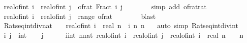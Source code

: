 \begin{isabellebody}
\ {\isachardoublequoteopen}real{\isacharunderscore}{\kern0pt}of{\isacharunderscore}{\kern0pt}int\ i\ {\isacharslash}{\kern0pt}\ real{\isacharunderscore}{\kern0pt}of{\isacharunderscore}{\kern0pt}int\ j\ {\isacharequal}{\kern0pt}\ of{\isacharunderscore}{\kern0pt}rat\ {\isacharparenleft}{\kern0pt}Fract\ i\ j{\isacharparenright}{\kern0pt}{\isachardoublequoteclose}\isanewline
\ \ \ \ \ \ \isamarkupfalse%
\ {\isacharparenleft}{\kern0pt}simp\ add{\isacharcolon}{\kern0pt}\ of{\isacharunderscore}{\kern0pt}rat{\isacharunderscore}{\kern0pt}rat{\isacharparenright}{\kern0pt}\isanewline
\ \ \ \ \isamarkupfalse%
\ \isamarkupfalse%
\ {\isachardoublequoteopen}real{\isacharunderscore}{\kern0pt}of{\isacharunderscore}{\kern0pt}int\ i\ {\isacharslash}{\kern0pt}\ real{\isacharunderscore}{\kern0pt}of{\isacharunderscore}{\kern0pt}int\ j\ {\isasymin}\ range\ of{\isacharunderscore}{\kern0pt}rat{\isachardoublequoteclose}\isanewline
\ \ \ \ \ \ \isamarkupfalse%
\ blast\isanewline
\ \ \isamarkupfalse%
\isanewline
{}\isamarkupfalse%
%
\endisatagproof
{\isafoldproof}%
%
\isadelimproof
\isanewline
%
\endisadelimproof
\isanewline
{}\isamarkupfalse%
\ Rats{\isacharunderscore}{\kern0pt}eq{\isacharunderscore}{\kern0pt}int{\isacharunderscore}{\kern0pt}div{\isacharunderscore}{\kern0pt}nat{\isacharcolon}{\kern0pt}\ {\isachardoublequoteopen}{\isasymrat}\ {\isacharequal}{\kern0pt}\ {\isacharbraceleft}{\kern0pt}\ real{\isacharunderscore}{\kern0pt}of{\isacharunderscore}{\kern0pt}int\ i\ {\isacharslash}{\kern0pt}\ real\ n\ {\isacharbar}{\kern0pt}\ i\ n{\isachardot}{\kern0pt}\ n\ {\isasymnoteq}\ {}{\isacharbraceright}{\kern0pt}{\isachardoublequoteclose}\isanewline
%
\isadelimproof
%
\endisadelimproof
%
\isatagproof
{}\isamarkupfalse%
\ {\isacharparenleft}{\kern0pt}auto\ simp{\isacharcolon}{\kern0pt}\ Rats{\isacharunderscore}{\kern0pt}eq{\isacharunderscore}{\kern0pt}int{\isacharunderscore}{\kern0pt}div{\isacharunderscore}{\kern0pt}int{\isacharparenright}{\kern0pt}\isanewline
\ \ \isamarkupfalse%
\ i\ j\ {\isacharcolon}{\kern0pt}{\isacharcolon}{\kern0pt}\ int\isanewline
\ \ \isamarkupfalse%
\ {\isachardoublequoteopen}j\ {\isasymnoteq}\ {}{\isachardoublequoteclose}\isanewline
\ \ \isamarkupfalse%
\ {\isachardoublequoteopen}{\isasymexists}{\isacharparenleft}{\kern0pt}i{\isacharprime}{\kern0pt}{\isacharcolon}{\kern0pt}{\isacharcolon}{\kern0pt}int{\isacharparenright}{\kern0pt}\ {\isacharparenleft}{\kern0pt}n{\isacharcolon}{\kern0pt}{\isacharcolon}{\kern0pt}nat{\isacharparenright}{\kern0pt}{\isachardot}{\kern0pt}\ real{\isacharunderscore}{\kern0pt}of{\isacharunderscore}{\kern0pt}int\ i\ {\isacharslash}{\kern0pt}\ real{\isacharunderscore}{\kern0pt}of{\isacharunderscore}{\kern0pt}int\ j\ {\isacharequal}{\kern0pt}\ real{\isacharunderscore}{\kern0pt}of{\isacharunderscore}{\kern0pt}int\ i{\isacharprime}{\kern0pt}\ {\isacharslash}{\kern0pt}\ real\ n\ {\isasymand}\ {}\ {\isacharless}{\kern0pt}\ n{\isachardoublequoteclose}\isanewline

\end{isabellebody}

